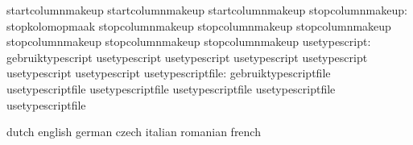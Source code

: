                                   startcolumnmakeup                startcolumnmakeup
                                  startcolumnmakeup
                stopcolumnmakeup: stopkolomopmaak                  stopcolumnmakeup
                                  stopcolumnmakeup                 stopcolumnmakeup
                                  stopcolumnmakeup                 stopcolumnmakeup
                                  stopcolumnmakeup
                   usetypescript: gebruiktypescript                usetypescript
                                  usetypescript                    usetypescript
                                  usetypescript                    usetypescript
                                  usetypescript
               usetypescriptfile: gebruiktypescriptfile            usetypescriptfile
                                  usetypescriptfile                usetypescriptfile
                                  usetypescriptfile                usetypescriptfile

\stopcommands




\startcommands                    dutch                            english
                                  german                           czech
                                  italian                          romanian
                                  french

